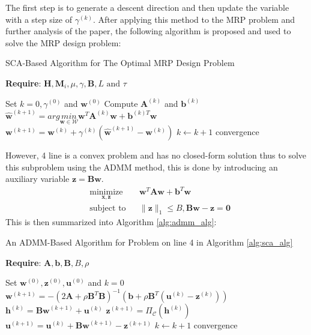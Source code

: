 The first step is to generate a descent direction and then update the variable with a step size of $\gamma^{(k)}$. After applying this method to the MRP problem and further analysis of the paper, the following algorithm is proposed and used to solve the MRP design problem:
\begin{algorithm}
    \caption{SCA-Based Algorithm for The Optimal MRP Design Problem}\label{alg:sca_alg}
    \textbf{Require}: $\mathbf{H}, \mathbf{M}_i, \mu, \gamma, \mathbf{B}, L \text{ and } \tau$
    \begin{algorithmic}[1]
        \State Set $k=0, \gamma^{(0)}$ and $\mathbf{w}^{(0)}$
        \Repeat
        \State Compute $\mathbf{A}^{(k)}$ and $\mathbf{b}^{(k)}$
        \State $\hat{\mathbf{w}}^{(k+1)} = arg \underset{\mathbf{w} \in \mathcal{W}}{min} \mathbf{w}^{T}\mathbf{A}^{(k)}\mathbf{w} + \mathbf{b}^{(k)T}\mathbf{w}$
        \State $\mathbf{w}^{(k+1)} = \mathbf{w}^{(k)} + \gamma^{(k)}(\hat{\mathbf{w}}^{(k+1)} - \mathbf{w}^{(k)})$
        \State $k \leftarrow k+1$
        \Until convergence
    \end{algorithmic}
\end{algorithm}

\noindent However, 4 line is a convex problem and has no closed-form solution thus to solve this subproblem using the ADMM method, this is done by introducing an auxiliary variable $\mathbf{z = Bw}$.
\begin{equation*}
    \begin{aligned}
         & \underset{\mathbf{x, z}}{\text{minimize}}
         &                                           & \mathbf{w}^{T}\mathbf{A}\mathbf{w} + \mathbf{b}^{T}\mathbf{w} \\
         & \text{subject to}
         &                                           & \big\| \mathbf{z} \big\|_1 \leq B, \mathbf{Bw - z=0}
    \end{aligned}
\end{equation*}
\noindent This is then summarized into Algorithm \ref{alg:admm_alg}:
\begin{algorithm}
    \caption{An ADMM-Based Algorithm for Problem on line 4 in Algorithm \ref{alg:sca_alg}}\label{alg:admm_alg}
    \textbf{Require}: $\mathbf{A}, \mathbf{b}, \mathbf{B}, B, \rho$
    \begin{algorithmic}[1]
        \State Set $\mathbf{w}^{(0)}, \mathbf{z}^{(0)}, \mathbf{u}^{(0)}$ and $k=0$
        \Repeat
        \State $\mathbf{w}^{(k+1)} = -(2\mathbf{A} + \rho \mathbf{B}^T\mathbf{B})^{-1}(\mathbf{b} + \rho \mathbf{B}^T(\mathbf{u}^{(k)} - \mathbf{z}^{(k)}))$
        \State $\mathbf{h}^{(k)} = \mathbf{Bw}^{(k+1)} + \mathbf{u}^{(k)}$
        \State $\mathbf{z}^{(k+1)} = \Pi_{\mathcal{C}}(\mathbf{h}^{(k)})$
        \State $\mathbf{u}^{(k+1)} = \mathbf{u}^{(k)} + \mathbf{Bw}^{(k+1)} - \mathbf{z}^{(k+1)}$
        \State $k \leftarrow k+1$
        \Until convergence
    \end{algorithmic}
\end{algorithm}

